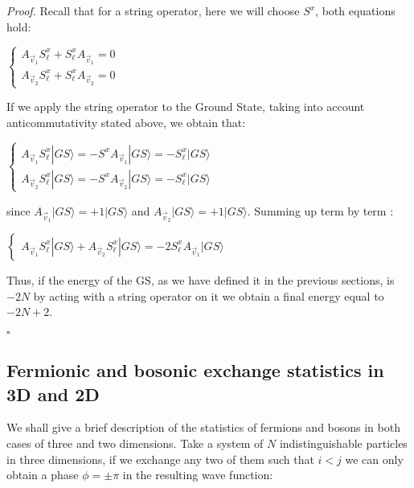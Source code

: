 \documentclass{Configuration_Files/PoliMi3i_thesis}
\begin{document}
\textit{Proof.} \newline
Recall that for a string operator, here we will choose $S^x$, both equations hold:

\begin{center}
	$\begin{cases} 
		A_{\vec{v}_1}S^x_\ell + S^x_\ell A_{\vec{v}_1}  =0 \\
		A_{\vec{v}_2} S^x_\ell + S^x_\ell A_{\vec{v}_2} =0
	\end{cases}$ 
\end{center}

If we apply the string operator to the Ground State, taking into account anticommutativity stated above, we obtain that:

\begin{center}
	$\begin{cases}
		A_{\vec{v}_1} S^x_\ell |GS\rangle = - S^x A_{\vec{v}_1} |GS\rangle = - S^x_\ell |GS\rangle \\
		
		A_{\vec{v}_2} S^x_\ell |GS\rangle = - S^x A_{\vec{v}_2} |GS\rangle = - S^x_\ell |GS\rangle
	\end{cases}$ 
\end{center}

since $A_{\vec{v}_1}|GS\rangle = +1|GS\rangle$ and $A_{\vec{v}_2}|GS\rangle = +1|GS\rangle$.
Summing up term by term :

\begin{center}
	$\begin{cases}
		A_{\vec{v}_1} S^x_\ell |GS\rangle + A_{\vec{v}_2} S^x_\ell |GS\rangle = - 2 S^x_\ell A_{\vec{v}_1} |GS\rangle
	\end{cases}$ 
\end{center}

Thus, if the energy of the GS, as we have defined it in the previous sections, is $-2N$ by acting with a string operator on  it we obtain a final energy equal to $-2N+2$.

\hfill $\square$ 







\subsection{Fermionic and bosonic exchange statistics in 3D and 2D}
We shall give a brief description of the statistics of fermions and bosons in both cases of three and two dimensions. \newline
Take a system of $N$ indistinguishable particles in three dimensions, if we exchange any two of them such that $i<j$ we can only obtain a phase $\phi=\pm \pi$ in the resulting wave function:  
\end{document}
